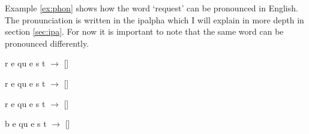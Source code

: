 Example \ref{ex:phon} shows how the word `request' can be pronounced in English. The pronunciation is written in the \ac{ipalpha} which I will explain in more depth in section \ref{sec:ipa}. For now it is important to note that the same word can be pronounced differently.

\begin{covsubexamples}[preamble={Different pronunciations of the English word `request' (except for the last example). The spaces indicate how the letters can be mapped to the phonetic symbols on the right side:}] \label{ex:phon}
\item \label{ex:phonetics} r e qu e s t $\rightarrow$ [] %
\item \label{ex:phonetics2} r e qu e s t $\rightarrow$ [] %
\item \label{ex:phonetics3} r e qu e s t $\rightarrow$ [] %
\item \label{ex:phonetics4} b e qu e s t $\rightarrow$ [] %
\end{covsubexamples}


